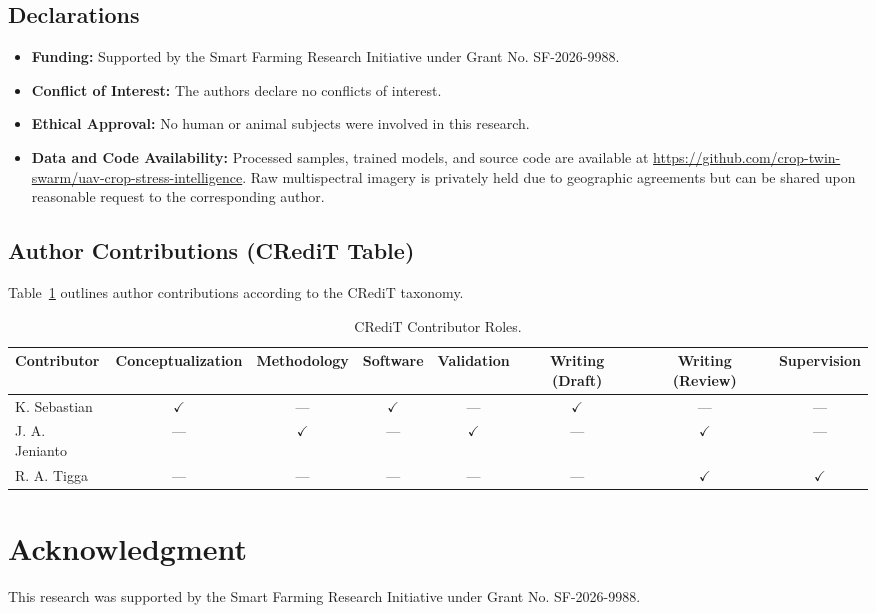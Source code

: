 \documentclass[review,3p,times,authoryear]{elsarticle}
\begin{document}
\subsection{Declarations}
\begin{itemize}
    \item \textbf{Funding:} Supported by the Smart Farming Research Initiative under Grant No. SF-2026-9988.
    \item \textbf{Conflict of Interest:} The authors declare no conflicts of interest.
    \item \textbf{Ethical Approval:} No human or animal subjects were involved in this research.
    \item \textbf{Data and Code Availability:} Processed samples, trained models, and source code are available at \url{https://github.com/crop-twin-swarm/uav-crop-stress-intelligence}. Raw multispectral imagery is privately held due to geographic agreements but can be shared upon reasonable request to the corresponding author.
\end{itemize}

\subsection{Author Contributions (CRediT Table)}
Table~\ref{tab:credit} outlines author contributions according to the CRediT taxonomy.

\begin{table}[H]
\centering
\caption{CRediT Contributor Roles.}
\label{tab:credit}
\begin{tabular}{lccccccc}
\toprule
Contributor & Conceptualization & Methodology & Software & Validation & Writing (Draft) & Writing (Review) & Supervision \\
\midrule
K. Sebastian & $\checkmark$ & --- & $\checkmark$ & --- & $\checkmark$ & --- & --- \\
J. A. Jenianto & --- & $\checkmark$ & --- & $\checkmark$ & --- & $\checkmark$ & --- \\
R. A. Tigga & --- & --- & --- & --- & --- & $\checkmark$ & $\checkmark$ \\
\bottomrule
\end{tabular}
\end{table}

\section*{Acknowledgment}
This research was supported by the Smart Farming Research Initiative under Grant No. SF-2026-9988.
\end{document}
